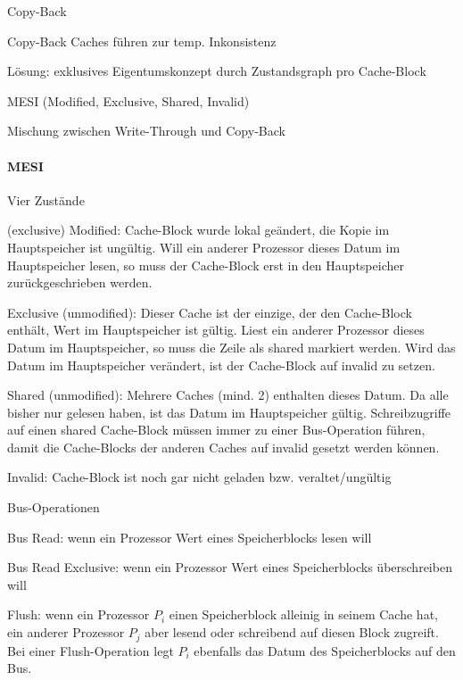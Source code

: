 \documentclass[10pt,landscape]{article}
\begin{document}
\begin{multicols}{3}
  Copy-Back
  \begin{itemize*}
    \item Copy-Back Caches führen zur temp. Inkonsistenz
    \item Lösung: exklusives Eigentumskonzept durch Zustandsgraph pro Cache-Block
    \item MESI (Modified, Exclusive, Shared, Invalid)
    \item Mischung zwischen Write-Through und Copy-Back
  \end{itemize*}
  
  \paragraph{MESI}
  Vier Zustände
  \begin{itemize*}
    \item (exclusive) Modified: Cache-Block wurde lokal geändert, die Kopie im Hauptspeicher ist ungültig. Will ein anderer Prozessor dieses Datum im Hauptspeicher lesen, so muss der Cache-Block erst in den Hauptspeicher zurückgeschrieben werden.
    \item Exclusive (unmodified): Dieser Cache ist der einzige, der den Cache-Block enthält, Wert im Hauptspeicher ist gültig. Liest ein anderer Prozessor dieses Datum im Hauptspeicher, so muss die Zeile als shared markiert werden. Wird das Datum im Hauptspeicher verändert, ist der Cache-Block auf invalid zu setzen.
    \item Shared (unmodified): Mehrere Caches (mind. 2) enthalten dieses Datum. Da alle bisher nur gelesen haben, ist das Datum im Hauptspeicher gültig. Schreibzugriffe auf einen shared Cache-Block müssen immer zu einer Bus-Operation führen, damit die Cache-Blocks der anderen Caches auf invalid gesetzt werden können.
    \item Invalid: Cache-Block ist noch gar nicht geladen bzw. veraltet/ungültig
  \end{itemize*}
  Bus-Operationen
  \begin{itemize*}
    \item Bus Read: wenn ein Prozessor Wert eines Speicherblocks lesen will
    \item Bus Read Exclusive: wenn ein Prozessor Wert eines Speicherblocks überschreiben will
    \item Flush: wenn ein Prozessor $P_i$ einen Speicherblock alleinig in seinem Cache hat, ein anderer Prozessor $P_j$ aber lesend oder schreibend auf diesen Block zugreift. Bei einer Flush-Operation legt $P_i$ ebenfalls das Datum des Speicherblocks auf den Bus.

\end{itemize*}
\end{multicols}
\end{document}
